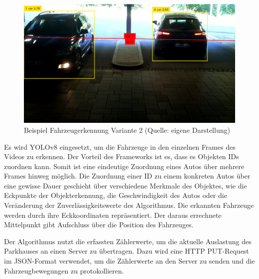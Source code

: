 \begin{figure}[h]
	\myImagePos{}
	\includegraphics[width=\myImageWidth]{Bilder/Method3_Beispiel.png}
	\caption[Variante 2 Beispiel]{Beispiel Fahrzeugerkennung Variante 2 (Quelle: eigene Darstellung)}
	\label{fig:Variante2}
\end{figure}

Es wird YOLOv8 eingesetzt, um die Fahrzeuge in den einzelnen Frames des Videos zu erkennen.
Der Vorteil des Frameworks ist es, dass es Objekten IDs zuordnen kann.
Somit ist eine eindeutige Zuordnung eines Autos über mehrere Frames hinweg möglich.
Die Zuordnung einer ID zu einem konkreten Autos über eine gewisse Dauer geschieht über verschiedene Merkmale des Objektes, wie die Eckpunkte der Objekterkennung, die Geschwindigkeit des Autos oder die Veränderung der Zuverlässigkeitswerte des Algorithmus.
Die erkannten Fahrzeuge werden durch ihre Eckkoordinaten repräsentiert.
Der daraus errechnete Mittelpunkt gibt Aufschluss über die Position des Fahrzeuges.

Der Algorithmus nutzt die erfassten Zählerwerte, um die aktuelle Auslastung des Parkhauses an einen Server zu übertragen.
Dazu wird eine HTTP PUT-Request im JSON-Format verwendet, um die Zählerwerte an den Server zu senden und die Fahrzeugbewegungen zu protokollieren.